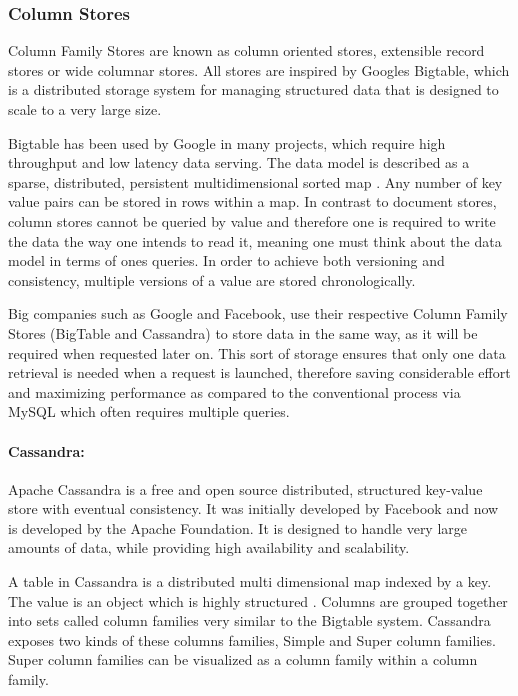 \subsubsection{Column Stores}
Column Family Stores are known as column oriented stores, extensible record stores or wide columnar stores. All stores are inspired by Googles Bigtable, which is a distributed storage system for managing structured data that is designed to scale to a very large size.\cite{Hecht:2011,Chang:2006} 

Bigtable has been used by Google in many projects, which require high throughput and low latency data serving. The data model is described as a sparse, distributed, persistent multidimensional sorted map \cite{Chang:2006} . Any number of key value pairs can be stored in rows within a map. In contrast to document stores, column stores cannot be queried by value and therefore one is required to write the data the way one intends to read it, meaning one must think about the data model in terms of ones queries. In order to achieve both versioning and consistency, multiple versions of a value are stored chronologically. 

Big companies such as Google and Facebook, use their respective Column Family Stores (BigTable and Cassandra) to store data in the same way, as it will be required when requested later on. This sort of storage  ensures that only one data retrieval is needed when a request is launched, therefore saving considerable effort and maximizing performance as compared to the conventional process via MySQL which often requires multiple queries.  

\paragraph{Cassandra:}
Apache Cassandra is a free and open source distributed, structured key-value store with eventual consistency. It was initially developed by Facebook and now is developed by the Apache Foundation. It is designed to handle very large amounts of data, while providing high availability and scalability.

A table in Cassandra is a distributed multi dimensional map indexed by a key. The value is an object which is highly structured \cite{biba2011learning}. Columns are grouped together into sets called column families very similar to the Bigtable system. Cassandra exposes two kinds of these columns families, Simple and Super column families. Super column families can be visualized as a column family within a column family\cite{biba2011learning}.

